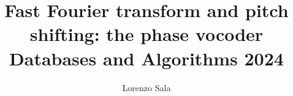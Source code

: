 \documentclass{article}
\begin{document}
	\title{Fast Fourier transform and pitch shifting: the phase vocoder\\\color{black}\small Databases and Algorithms 2024}
	\author{Lorenzo Sala}
	\date{}
	\maketitle
	\tableofcontents




\listofalgorithms
\printbibliography
\end{document}
